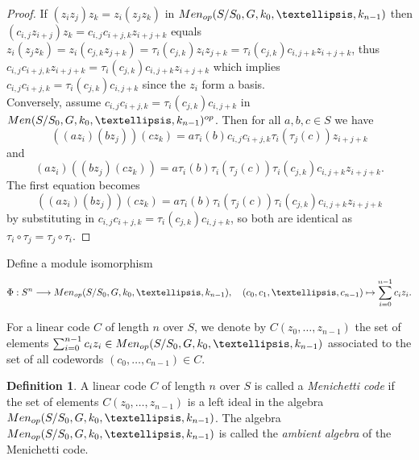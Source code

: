 \documentclass[11pt]{amsart}
\theoremstyle{plain}
\theoremstyle{definition}
\newtheorem{definition}[theorem]{Definition}
\begin{document}
\begin{proof}

If $(z_iz_j)z_k=z_i(z_jz_k) $ in ${\rm Men}_{op}(S/S_0, G, k_0,\dots,k_{n-1})$ then $(c_{i,j}z_{i+j})z_k= c_{i,j} c_{i+j,k} z_{i+j+k}$ equals
$z_i(z_jz_k)=z_i (c_{j,k}z_{j+k})=\tau_{i}(c_{j,k})z_i z_{j+k}=\tau_{i}(c_{j,k}) c_{i,j+k} z_{i+j+k}$, thus $c_{i,j} c_{i+j,k} z_{i+j+k}=\tau_{i}(c_{j,k}) c_{i,j+k} z_{i+j+k}$ which implies  $c_{i,j} c_{i+j,k} =\tau_{i}(c_{j,k}) c_{i,j+k}$ since the $z_i$ form a basis.
\\
Conversely, assume $c_{i,j} c_{i+j,k} =\tau_{i}(c_{j,k}) c_{i,j+k} $ in  ${\rm Men}(S/S_0, G, k_0,\dots,k_{n-1})^{op}$. Then for all $a,b,c\in S$ we have
$$((az_i)( b z_j)) (cz_k)= a\tau_i(b) c_{i,j}c_{i+j,k}\tau_i(\tau_j(c))z_{i+j+k}$$
and
$$(az_i) ((bz_j) (cz_k))= a\tau_i(b)\tau_i(\tau_j(c))\tau_i(c_{j,k})c_{i,j+k}z_{i+j+k}.$$
The first equation becomes
$$((az_i)( b z_j)) (cz_k)= a\tau_i(b) \tau_i(\tau_j(c)) \tau_{i}(c_{j,k}) c_{i,j+k}z_{i+j+k}$$
 by substituting in $c_{i,j} c_{i+j,k} =\tau_{i}(c_{j,k}) c_{i,j+k} $, so both are identical as $\tau_i\circ \tau_j=\tau_j\circ \tau_i$.
\end{proof}



 Define a module isomorphism
 $$\Phi:S^n\longrightarrow {\rm Men}_{op}(S/S_0,G, k_0,\dots,k_{n-1}),\quad (c_0,c_1,\dots,c_{n-1})\mapsto \sum_{i=0}^{n-1}c_iz_i.$$

   For a linear code $C$  of length $n$ over $S$, we denote by $C(z_0,\dots,z_{n-1})$ the set of elements
 $\sum_{i=0}^{n-1}c_i z_i\in {\rm Men}_{op}(S/S_0,G, k_0,\dots,k_{n-1})$ associated to the set of all codewords $(c_0,\dots,c_{n-1})\in C$.

 \begin{definition}
  A linear code $C$  of length $n$ over $S$ is called a  \emph{Menichetti code}
 if the set of elements $C(z_0,\dots,z_{n-1})$ is a left ideal in the algebra
 ${\rm Men}_{op}(S/S_0,G, k_0,\dots,k_{n-1})$. The algebra ${\rm Men}_{op}(S/S_0,G, k_0,\dots,k_{n-1})$ is called the \emph{ambient algebra} of the Menichetti  code.
  \end{definition}
\end{document}
